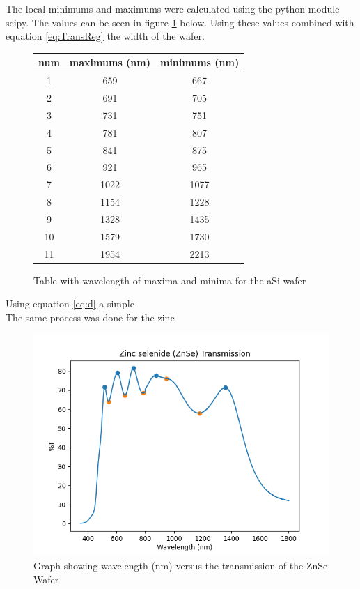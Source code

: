 \documentclass[10pt,a4paper]{article}
\begin{document}
\begin{multicols}{2}
The local minimums and maximums were calculated using the python module scipy. The values can be seen in figure \ref{AmSiTranTable} below. Using these values combined with equation \ref{eq:TransReg} the width of the wafer.


\begin{figure}[H]
\label{AmSiTranTable}
\centering
\begin{tabular}{ |c|c|c| } 
\hline
num & maximums (nm) & minimums (nm)\\
\hline
 1 & 659  & 667\\
 2 & 691  & 705\\
 3 & 731  & 751\\
 4 & 781  & 807\\
 5 & 841  & 875\\
 6 & 921  & 965\\
 7 & 1022 & 1077\\
 8 & 1154 & 1228\\
 9 & 1328 & 1435\\
 10& 1579 & 1730\\
 11& 1954 & 2213\\
\hline
\end{tabular}
\caption{Table with wavelength of maxima and minima for the aSi wafer}
\end{figure}
Using equation \ref{eq:d} a simple \\


The same process was done for the zinc 

\begin{figure}[H]
\label{znsetran}
\includegraphics[scale=0.5]{znsetp}
\caption{Graph showing wavelength (nm) versus the transmission of the ZnSe Wafer }
\end{figure}
    


\end{multicols}
\end{document}

